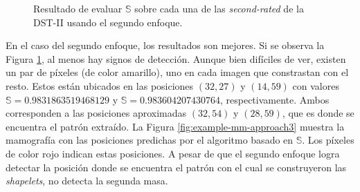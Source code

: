 \begin{figure}
	\caption{Resultado de evaluar $\mathbb{S}$ sobre cada una de las \textit{second-rated} de la DST-II usando el segundo enfoque.} \label{fig:example-mm-approach2}
\end{figure}

En el caso del segundo enfoque, los resultados son mejores. Si se observa la Figura \ref{fig:example-mm-approach2}, al menos hay signos de detección.
Aunque bien difíciles de ver, existen un par de píxeles (de color amarillo), uno en cada imagen que constrastan con el resto.
Estos están ubicados en las posiciones $(32,27)$ y $(14,59)$ con valores $\mathbb{S}=0.9831863519468129$ y $\mathbb{S}=0.983604207430764$,
respectivamente. Ambos corresponden a las posiciones aproximadas $(32,54)$ y $(28,59)$, que es donde se encuentra el patrón extraído.
La Figura \ref{fig:example-mm-approach3} muestra la mamografía con las posiciones 
predichas por el algoritmo basado en $\mathbb{S}$. Los píxeles de color rojo indican estas posiciones.
A pesar de que el segundo enfoque logra detectar la posición donde se encuentra el patrón con el cual se construyeron
las \textit{shapelets}, no detecta la segunda masa.

